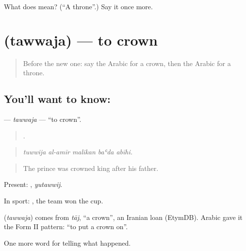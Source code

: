 \begin{tcolorbox}[breakable,colback=teal!4,colframe=teal!35!black,title={Before you move on}]
What does  mean? (\textquotedblleft{}A throne\textquotedblright{}.) Say it once more.
\end{tcolorbox}
\section[\texorpdfstring{\ar{توج} (tawwaja)}{توج (tawwaja)}]{ (tawwaja) — to crown}

\label{lesson:AR-C309-tawwaja}



\begin{quote}
Before the new one: say the Arabic for a crown, then the Arabic for a throne.
\end{quote}

\subsection*{You'll want to know: }
\textbf{} — \emph{tawwaja} — \textquotedblleft{}to crown\textquotedblright{}.

\begin{quote}
    .
\end{quote}

\begin{quote}
\emph{tuwwija al-amīr malikan baʿda abīhi.}
\end{quote}

\begin{quote}
The prince was crowned king after his father.
\end{quote}

Present: , \emph{yutawwij}.

In sport:   , the team won the cup.

\begin{cousinweb}
\textbf{} (\emph{tawwaja}) comes from \emph{tāj}, \textquotedblleft{}a crown\textquotedblright{}, an Iranian loan (EtymDB). Arabic gave it the Form II pattern: \textquotedblleft{}to put a crown on\textquotedblright{}.
\end{cousinweb}

\begin{grammarlens}[title={What you've built}]
One more word for telling what happened.
\end{grammarlens}

